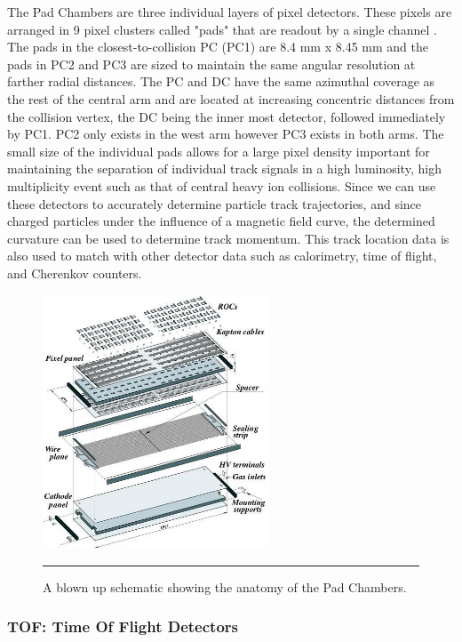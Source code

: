 The Pad Chambers are three individual layers of pixel detectors. These pixels are arranged in 9 pixel clusters called "pads" that are readout by a single channel \citep{PCfocus}. The pads in the closest-to-collision PC (PC1) are 8.4 mm x 8.45 mm and the pads in PC2 and PC3 are sized to maintain the same angular resolution at farther radial distances. The PC and DC have the same azimuthal coverage as the rest of the central arm and are located at increasing concentric distances from the collision vertex, the DC being the inner most detector, followed immediately by PC1.  PC2 only exists in the west arm however PC3 exists in both arms. The small size of the individual pads allows for a large pixel density important for maintaining the separation of individual track signals in a high luminosity, high multiplicity event such as that of central heavy ion collisions. Since we can use these detectors to accurately determine particle track trajectories, and since charged particles under the influence of a magnetic field curve, the determined curvature can be used to determine track momentum. This track location data is also used to match with other detector data such as calorimetry, time of flight, and Cherenkov counters.
\begin{figure}[htbp]
  \centering
    \includegraphics[width=0.6\textwidth]{Figures/pcdiagram.jpg}
    \rule{35em}{0.5pt}
  \caption[Schematic of the Pad Chambers]{A blown up schematic showing the anatomy of the Pad Chambers.}
  \label{fig:pcdiagram}
\end{figure}

\subsubsection{TOF: Time Of Flight Detectors}

